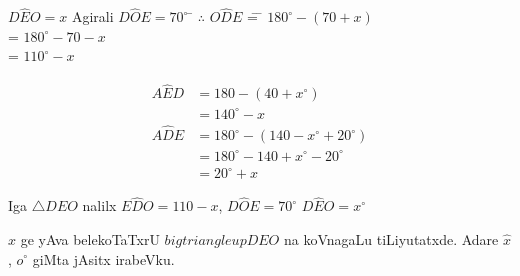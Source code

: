 \begin{tabbing}
$D\hat{E}O=x$  \; \; Agirali \;\; $D\hat{O}E=70^\circ$ \;\; \= $\therefore$ \;\; $O\hat{D}E$ \= = \= $180^\circ-(70+x)$\\
\> \> = \> $180^\circ-70-x$\\
\> \> = \> $110^\circ-x$
\end{tabbing}
\begin{align*}
A\hat{E}D &=180-(40+x^\circ)\\
&=140^\circ-x\\
A\hat{D}E & =180^\circ-(140-x^\circ+20^\circ)\\
&=180^\circ-140+x^\circ-20^\circ\\
& =20^\circ+x
\end{align*}

Iga \quad $\bigtriangleup DEO$ \quad nalilx \quad $E\hat{D}O=110-x$, \quad $D\hat{O}E=70^\circ$ \quad $D\hat{E}O=x^\circ$

$x$ ge yAva belekoTaTxrU \quad $bigtriangleupDEO$ \quad na koVnagaLu tiLiyutatxde. Adare \quad $\hat{x}$, \quad $o^\circ$ giMta jAsitx irabeVku.
